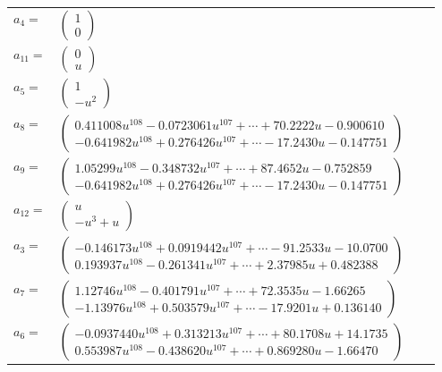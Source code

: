 \documentclass[1p]{elsarticle_modified}
\theoremstyle{definition}
\begin{document}
\begin{tabular}{m{7pt} m{180pt} m{7pt} m{180pt} }
\flushright $a_{4}=$&$\begin{pmatrix}1\\0\end{pmatrix}$ \\
\flushright $a_{11}=$&$\begin{pmatrix}0\\u\end{pmatrix}$ \\
\flushright $a_{5}=$&$\begin{pmatrix}1\\- u^2\end{pmatrix}$ \\
\flushright $a_{8}=$&$\begin{pmatrix}0.411008 u^{108}-0.0723061 u^{107}+\cdots+70.2222 u-0.900610\\-0.641982 u^{108}+0.276426 u^{107}+\cdots-17.2430 u-0.147751\end{pmatrix}$ \\
\flushright $a_{9}=$&$\begin{pmatrix}1.05299 u^{108}-0.348732 u^{107}+\cdots+87.4652 u-0.752859\\-0.641982 u^{108}+0.276426 u^{107}+\cdots-17.2430 u-0.147751\end{pmatrix}$ \\
\flushright $a_{12}=$&$\begin{pmatrix}u\\- u^3+u\end{pmatrix}$ \\
\flushright $a_{3}=$&$\begin{pmatrix}-0.146173 u^{108}+0.0919442 u^{107}+\cdots-91.2533 u-10.0700\\0.193937 u^{108}-0.261341 u^{107}+\cdots+2.37985 u+0.482388\end{pmatrix}$ \\
\flushright $a_{7}=$&$\begin{pmatrix}1.12746 u^{108}-0.401791 u^{107}+\cdots+72.3535 u-1.66265\\-1.13976 u^{108}+0.503579 u^{107}+\cdots-17.9201 u+0.136140\end{pmatrix}$ \\
\flushright $a_{6}=$&$\begin{pmatrix}-0.0937440 u^{108}+0.313213 u^{107}+\cdots+80.1708 u+14.1735\\0.553987 u^{108}-0.438620 u^{107}+\cdots+0.869280 u-1.66470\end{pmatrix}$ \\

\end{tabular}
\end{document}
